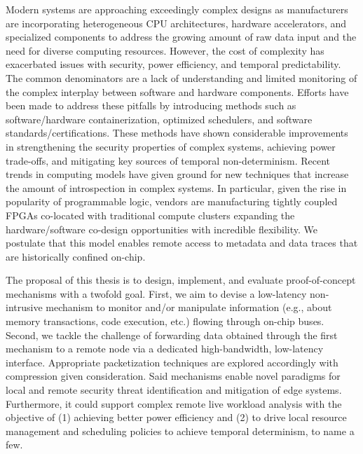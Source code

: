 


Modern systems are approaching exceedingly complex designs as manufacturers are incorporating heterogeneous CPU architectures, hardware accelerators, and specialized components to address the growing amount of raw data input and the need for diverse computing resources.
However, the cost of complexity has exacerbated issues with security, power efficiency, and temporal predictability. The common denominators are a lack of understanding and limited monitoring of the complex interplay between software and hardware components. Efforts have been made to address these pitfalls by introducing methods such as software/hardware containerization, optimized schedulers, and software standards/certifications. These methods have shown considerable improvements in strengthening the security properties of complex systems, achieving power trade-offs, and mitigating key sources of temporal non-determinism. Recent trends in computing models have given ground for new techniques that increase the amount of introspection in complex systems. In particular, given the rise in popularity of programmable logic, vendors are manufacturing tightly coupled FPGAs co-located with traditional compute clusters expanding the hardware/software co-design opportunities with incredible flexibility. We postulate that this model enables remote access to metadata and data traces that are historically confined on-chip.

The proposal of this thesis is to design, implement, and evaluate proof-of-concept mechanisms with a twofold goal. First, we aim to devise a low-latency non-intrusive mechanism to monitor and/or manipulate information (e.g., about memory transactions, code execution, etc.) flowing through on-chip buses. Second, we tackle the challenge of forwarding data obtained through the first mechanism to a remote node via a dedicated high-bandwidth, low-latency interface. Appropriate packetization techniques are explored accordingly with compression given consideration. Said mechanisms enable novel paradigms for local and remote security threat identification and mitigation of edge systems. Furthermore, it could support complex remote live workload analysis with the objective of (1) achieving better power efficiency and (2) to drive local resource management and scheduling policies to achieve temporal determinism, to name a few.
